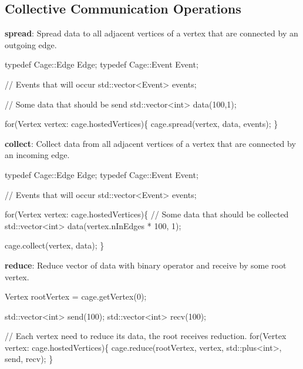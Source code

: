 \subsection*{Collective Communication Operations}


\begin{DoxyItemize}
\item {\bfseries spread}\+: Spread data to all adjacent vertices of a vertex that are connected by an outgoing edge. 
\begin{DoxyCode}
\textcolor{keyword}{typedef} Cage::Edge  Edge;
\textcolor{keyword}{typedef} Cage::Event Event;

\textcolor{comment}{// Events that will occur}
std::vector<Event> events;

\textcolor{comment}{// Some data that should be send}
std::vector<int> data(100,1);

\textcolor{keywordflow}{for}(Vertex vertex: cage.hostedVertices)\{
    cage.spread(vertex, data, events);
\}
\end{DoxyCode}

\item {\bfseries collect}\+: Collect data from all adjacent vertices of a vertex that are connected by an incoming edge. 
\begin{DoxyCode}
\textcolor{keyword}{typedef} Cage::Edge  Edge;
\textcolor{keyword}{typedef} Cage::Event Event;

\textcolor{comment}{// Events that will occur}
std::vector<Event> events;

\textcolor{keywordflow}{for}(Vertex vertex: cage.hostedVertices)\{
    \textcolor{comment}{// Some data that should be collected}
    std::vector<int> data(vertex.nInEdges * 100, 1);

    cage.collect(vertex, data);
\}
\end{DoxyCode}

\item {\bfseries reduce}\+: Reduce vector of data with binary operator and receive by some root vertex. 
\begin{DoxyCode}
Vertex rootVertex = cage.getVertex(0);

std::vector<int> send(100);
std::vector<int> recv(100);

\textcolor{comment}{// Each vertex need to reduce its data, the root receives reduction.}
\textcolor{keywordflow}{for}(Vertex vertex: cage.hostedVertices)\{
    cage.reduce(rootVertex, vertex, std::plus<int>, send, recv);
\}
\end{DoxyCode}


\end{DoxyItemize}
